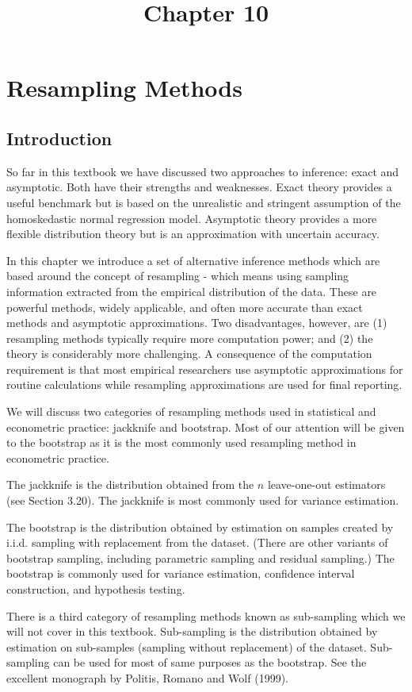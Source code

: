 \documentclass[10pt]{article}
\title{Chapter 10 }
\author{}
\date{}
\begin{document}
\maketitle
\section{Resampling Methods}
\subsection{Introduction}
So far in this textbook we have discussed two approaches to inference: exact and asymptotic. Both have their strengths and weaknesses. Exact theory provides a useful benchmark but is based on the unrealistic and stringent assumption of the homoskedastic normal regression model. Asymptotic theory provides a more flexible distribution theory but is an approximation with uncertain accuracy.

In this chapter we introduce a set of alternative inference methods which are based around the concept of resampling - which means using sampling information extracted from the empirical distribution of the data. These are powerful methods, widely applicable, and often more accurate than exact methods and asymptotic approximations. Two disadvantages, however, are (1) resampling methods typically require more computation power; and (2) the theory is considerably more challenging. A consequence of the computation requirement is that most empirical researchers use asymptotic approximations for routine calculations while resampling approximations are used for final reporting.

We will discuss two categories of resampling methods used in statistical and econometric practice: jackknife and bootstrap. Most of our attention will be given to the bootstrap as it is the most commonly used resampling method in econometric practice.

The jackknife is the distribution obtained from the $n$ leave-one-out estimators (see Section 3.20). The jackknife is most commonly used for variance estimation.

The bootstrap is the distribution obtained by estimation on samples created by i.i.d. sampling with replacement from the dataset. (There are other variants of bootstrap sampling, including parametric sampling and residual sampling.) The bootstrap is commonly used for variance estimation, confidence interval construction, and hypothesis testing.

There is a third category of resampling methods known as sub-sampling which we will not cover in this textbook. Sub-sampling is the distribution obtained by estimation on sub-samples (sampling without replacement) of the dataset. Sub-sampling can be used for most of same purposes as the bootstrap. See the excellent monograph by Politis, Romano and Wolf (1999).
\end{document}
